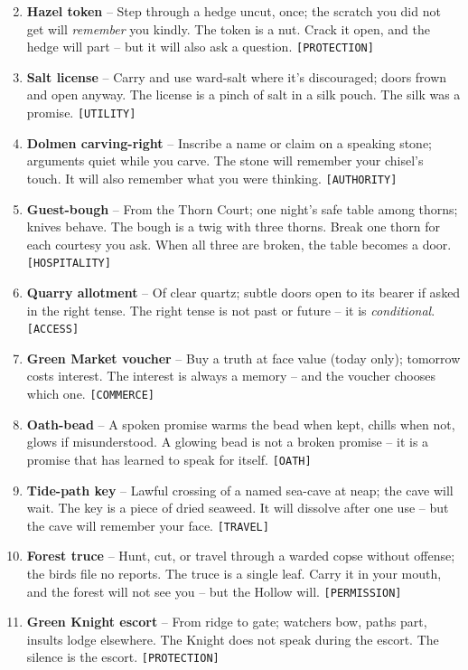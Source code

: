 \begin{enumerate}
\setcounter{enumi}{1}
\item \textbf{Hazel token} -- Step through a hedge uncut, once; the scratch you did not get will \emph{remember} you kindly. The token is a nut. Crack it open, and the hedge will part -- but it will also ask a question. \texttt{[PROTECTION]}
\item \textbf{Salt license} -- Carry and use ward-salt where it's discouraged; doors frown and open anyway. The license is a pinch of salt in a silk pouch. The silk was a promise. \texttt{[UTILITY]}
\item \textbf{Dolmen carving-right} -- Inscribe a name or claim on a speaking stone; arguments quiet while you carve. The stone will remember your chisel's touch. It will also remember what you were thinking. \texttt{[AUTHORITY]}
\item \textbf{Guest-bough} -- From the Thorn Court; one night's safe table among thorns; knives behave. The bough is a twig with three thorns. Break one thorn for each courtesy you ask. When all three are broken, the table becomes a door. \texttt{[HOSPITALITY]}
\item \textbf{Quarry allotment} -- Of clear quartz; subtle doors open to its bearer if asked in the right tense. The right tense is not past or future -- it is \emph{conditional}. \texttt{[ACCESS]}
\item \textbf{Green Market voucher} -- Buy a truth at face value (today only); tomorrow costs interest. The interest is always a memory -- and the voucher chooses which one. \texttt{[COMMERCE]}
\item \textbf{Oath-bead} -- A spoken promise warms the bead when kept, chills when not, glows if misunderstood. A glowing bead is not a broken promise -- it is a promise that has learned to speak for itself. \texttt{[OATH]}
\item \textbf{Tide-path key} -- Lawful crossing of a named sea-cave at neap; the cave will wait. The key is a piece of dried seaweed. It will dissolve after one use -- but the cave will remember your face. \texttt{[TRAVEL]}
\item \textbf{Forest truce} -- Hunt, cut, or travel through a warded copse without offense; the birds file no reports. The truce is a single leaf. Carry it in your mouth, and the forest will not see you -- but the Hollow will. \texttt{[PERMISSION]}
\item[J] \textbf{Green Knight escort} -- From ridge to gate; watchers bow, paths part, insults lodge elsewhere. The Knight does not speak during the escort. The silence is the escort. \texttt{[PROTECTION]}

\end{enumerate}
